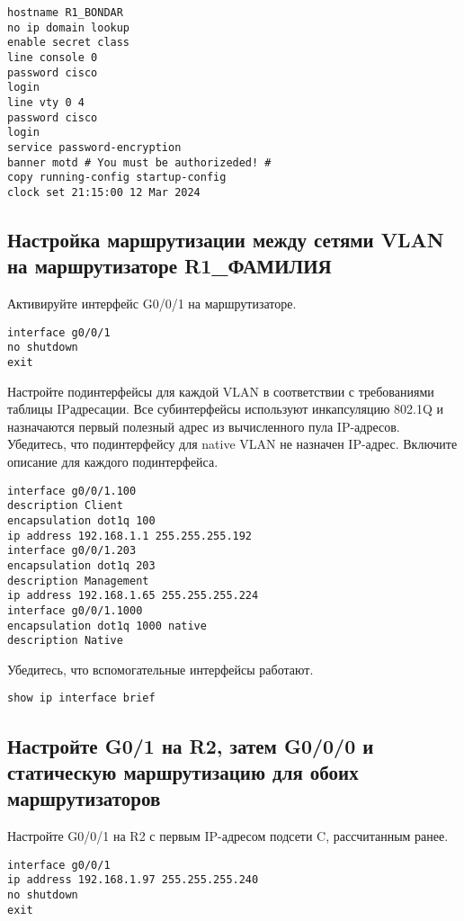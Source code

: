 \begin{verbatim}
hostname R1_BONDAR
no ip domain lookup
enable secret class
line console 0
password cisco
login
line vty 0 4
password cisco
login
service password-encryption
banner motd # You must be authorizeded! #
copy running-config startup-config
clock set 21:15:00 12 Mar 2024
\end{verbatim}

\subsection{Настройка маршрутизации между сетями VLAN
	на маршрутизаторе R1\_ФАМИЛИЯ}

Активируйте интерфейс G0/0/1 на маршрутизаторе.

\begin{verbatim}
interface g0/0/1
no shutdown
exit
\end{verbatim}

Настройте подинтерфейсы для каждой VLAN
в соответствии с требованиями таблицы IPадресации.
Все субинтерфейсы используют инкапсуляцию 802.1Q
и назначаются первый полезный адрес из вычисленного пула IP-адресов.
Убедитесь, что подинтерфейсу для native VLAN не назначен IP-адрес.
Включите описание для каждого подинтерфейса.

\begin{verbatim}
interface g0/0/1.100
description Client
encapsulation dot1q 100
ip address 192.168.1.1 255.255.255.192
interface g0/0/1.203
encapsulation dot1q 203
description Management
ip address 192.168.1.65 255.255.255.224
interface g0/0/1.1000
encapsulation dot1q 1000 native
description Native
\end{verbatim}

Убедитесь, что вспомогательные интерфейсы работают.

\begin{verbatim}
show ip interface brief
\end{verbatim}

\subsection{Настройте G0/1 на R2, затем G0/0/0
	и статическую маршрутизацию для обоих маршрутизаторов}

Настройте G0/0/1 на R2 с первым IP-адресом подсети C, рассчитанным ранее.

\begin{verbatim}
interface g0/0/1
ip address 192.168.1.97 255.255.255.240
no shutdown
exit
\end{verbatim}

